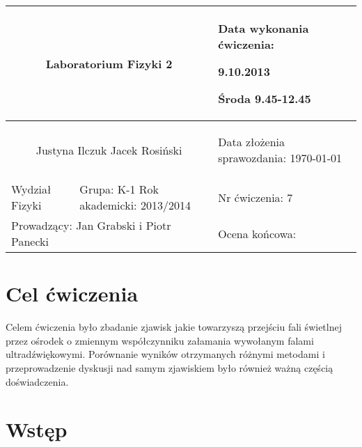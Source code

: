 \documentclass[a4paper,12pt]{article}
\author{Justyna Ilczuk, Jacek Rosiński}
\begin{document}
\begin{center}

    \begin{tabular}{ | m{5cm}| m{5cm} | m{5cm} |}
    \hline 
    \multicolumn{2}{|c|}{{ \Large \textbf{Laboratorium Fizyki 2}} }
    &  
    \begin{center}
    Data wykonania ćwiczenia:
    \end{center}
    \begin{center}
      9.10.2013 
    \end{center}
    \begin{center}
    Środa 9.45-12.45
    \end{center}
     \\ 
    
    \hline
    \multicolumn{2}{|c|}{Justyna Ilczuk \newline Jacek Rosiński}
    & \begin{center}
    {\small Data złożenia sprawozdania:} \newline \today
    \end{center}   \\
   	
   	\hline
    Wydział Fizyki & Grupa: K-1 \newline Rok akademicki: 2013/2014 &    Nr ćwiczenia: 7 \\
   	\hline
   	\multicolumn{2}{|l|}{Prowadzący: Jan Grabski i Piotr Panecki} & \multicolumn{1}{|l|}{Ocena końcowa:}\\
    \hline
    \end{tabular}
\end{center}

\newpage

\pagestyle{fancy}
\fancyfoot[CO]{\ }
\fancyhead[RO]{\footnotesize{\thepage} }


\section{Cel ćwiczenia}

Celem ćwiczenia było zbadanie zjawisk jakie towarzyszą przejściu fali świetlnej przez ośrodek o zmiennym współczynniku załamania wywołanym falami ultradźwiękowymi. Porównanie wyników otrzymanych różnymi metodami i przeprowadzenie dyskusji nad samym zjawiskiem było również ważną częścią doświadczenia. 


\section{Wstęp}
\end{document}
